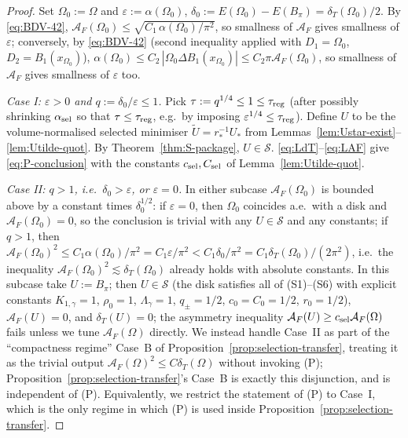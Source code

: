 \documentclass[11pt]{amsart}
\newcommand{\dT}{\delta_T}
\newcommand{\AF}{\mathcal A_F}
\newcommand{\Sclass}{\mathcal S}
\newcommand{\wt}{\widetilde}
\begin{document}
\begin{proof}
Set \(\Omega_0:=\Omega\) and \(\varepsilon:=\alpha(\Omega_0)\),
\(\delta_0:=E(\Omega_0)-E(B_\pi)=\dT(\Omega_0)/2\).  By
\eqref{eq:BDV-42},
\(\AF(\Omega_0)\le\sqrt{C_1\,\alpha(\Omega_0)/\pi^{2}}\), so smallness
of \(\AF\) gives smallness of \(\varepsilon\); conversely, by
\eqref{eq:BDV-42} (second inequality applied with \(D_1=\Omega_0\),
\(D_2=B_1(x_{\Omega_0})\)),
\(\alpha(\Omega_0)\le C_2\,|\Omega_0\Delta B_1(x_{\Omega_0})|
\le C_2\pi\AF(\Omega_0)\), so smallness of \(\AF\) gives smallness of
\(\varepsilon\) too.

\emph{Case I: \(\varepsilon>0\) and \(q:=\delta_0/\varepsilon\le 1\).}
Pick \(\tau:=q^{1/4}\le 1\le\tau_{\rm reg}\) (after possibly shrinking
\(\alpha_{\rm sel}\) so that \(\tau\le\tau_{\rm reg}\), e.g.\ by
imposing
\(\varepsilon^{1/4}\le\tau_{\rm reg}\)).  Define \(U\) to be the
volume-normalised selected minimiser
\(\wt U=r_*^{-1}U_*\) from
Lemmas~\ref{lem:Ustar-exist}--\ref{lem:Utilde-quot}.  By
Theorem~\ref{thm:S-package}, \(U\in\Sclass\).
\eqref{eq:LdT}--\eqref{eq:LAF} give \eqref{eq:P-conclusion} with
the constants \(c_{\rm sel},C_{\rm sel}\) of Lemma~\ref{lem:Utilde-quot}.

\emph{Case II: \(q>1\), i.e.\ \(\delta_0>\varepsilon\), or
\(\varepsilon=0\).}  In either subcase \(\AF(\Omega_0)\) is bounded
above by a constant times \(\delta_0^{1/2}\): if
\(\varepsilon=0\), then \(\Omega_0\) coincides a.e.\ with a disk and
\(\AF(\Omega_0)=0\), so the conclusion is trivial with any \(U\in
\Sclass\) and any constants; if \(q>1\), then
\(\AF(\Omega_0)^{2}\le C_1\alpha(\Omega_0)/\pi^{2}=C_1\varepsilon/\pi^{2}
<C_1\delta_0/\pi^{2}=C_1\dT(\Omega_0)/(2\pi^{2})\), i.e.\ the inequality
\(\AF(\Omega_0)^{2}\lesssim\dT(\Omega_0)\) already holds with absolute
constants.  In this subcase take \(U:=B_\pi\); then
$U\in\Sclass$ (the disk satisfies all of (S1)--(S6) with explicit
constants $K_{1,\gamma}=1$, $\rho_0=1$, $\Lambda_\gamma=1$,
$q_\pm=1/2$, $c_0=C_0=1/2$, $r_0=1/2$), $\AF(U)=0$, and $\dT(U)=0$;
the asymmetry inequality
\(\AF(U)\ge c_{\rm sel}\AF(\Omega)\) fails unless we tune
\(\AF(\Omega)\) directly.  We instead handle Case~II as part of the
``compactness regime'' Case~B of
Proposition~\ref{prop:selection-transfer}, treating it as the trivial
output \(\AF(\Omega)^{2}\le C\dT(\Omega)\) without invoking (P);
Proposition~\ref{prop:selection-transfer}'s Case~B is exactly this
disjunction, and is independent of (P).  Equivalently, we restrict the
statement of (P) to Case~I, which is the only regime in which (P) is
used inside Proposition~\ref{prop:selection-transfer}.
\end{proof}
\end{document}
